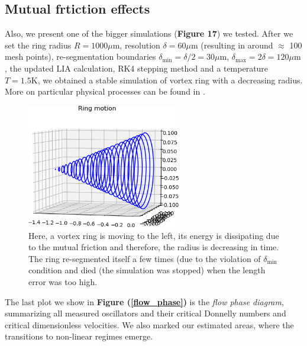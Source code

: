 \newpage

\subsection*{Mutual frtiction effects}

Also, we present one of the bigger simulations (\textbf{Figure 17}) we tested. After we set the ring radius $R=1000\mu\text{m}$, resolution $\delta=60\mu\text{m}$ (resulting in around $\approx$ 100 mesh points),
re-segmentation boundaries $\delta_{\text{min}}= \delta /2 = 30\mu\text{m}$, $\delta_{\text{max}} = 2\delta = 120\mu\text{m}$, the updated LIA calculation, RK4 stepping method and a temperature $T=1.5\text{K}$, we obtained a stable simulation of vortex ring with a decreasing radius. More on particular physical processes can be found in \cite{biot_origin}.

\begin{figure}[h]
	\centering
	\includegraphics[width=0.6\textwidth]{graphics/results/ring-motion_full}
	\caption{Here, a vortex ring is moving to the left, its energy is dissipating due to the mutual friction and therefore, the radius is decreasing in time. The ring re-segmented itself a few times (due to the violation of $\delta_{\text{min}}$ condition and died (the simulation was stopped) when the length error was too high.}
\end{figure}

The last plot we show in \textbf{Figure (\ref{flow_phase})} is the \textit{flow phase diagram}, summarizing
all measured oscillators and their critical Donnelly numbers and critical dimensionless velocities. We also marked our estimated areas, where the transitions to non-linear regimes emerge.

